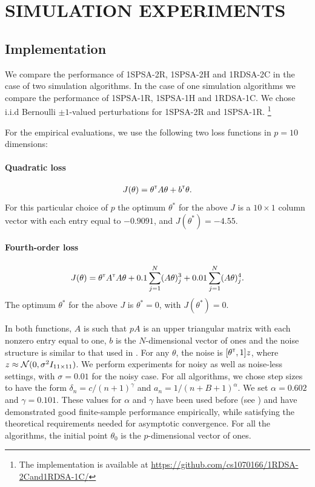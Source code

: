 \section{SIMULATION EXPERIMENTS}
\label{sec:expts}
\subsection{Implementation}
We compare the performance of 1SPSA-2R, 1SPSA-2H and 1RDSA-2C in the case of 
two simulation algorithms. In the case of one simulation algorithms we compare the 
performance of 1SPSA-1R, 1SPSA-1H and 1RDSA-1C. 
We chose i.i.d Bernoulli $\pm 1$-valued perturbations for 1SPSA-2R and 1SPSA-1R.
\footnote{The implementation is available at 
\url{https://github.com/cs1070166/1RDSA-2Cand1RDSA-1C/}}

For the empirical evaluations, 
we use the following two loss functions in $p=10$ dimensions:
\paragraph{Quadratic loss}
\begin{align}
J(\theta) = \theta^\mathsf{\scriptscriptstyle T} A \theta + b^\mathsf{\scriptscriptstyle T} \theta. \label{eq:quadratic}
\end{align} 
For this particular choice of $p$ the optimum $\theta^*$ for the above $J$ is 
a $10 \times 1$ column vector with each entry equal to 
$-0.9091$, and $J(\theta^*) = -4.55$.

\paragraph{Fourth-order loss}
\begin{align} 
J(\theta) = \theta ^\mathsf{\scriptscriptstyle T} A^\mathsf{\scriptscriptstyle T} A\theta+0.1 \sum_{j=1}^N (A\theta)^3_j+0.01 \sum_{j=1}^N (A\theta)^4_j.\label{eq:4thorder}
 \end{align} 
The optimum $\theta^*$ for the above $J$ is $\theta^*=0$, with $J(\theta^*) = 0$. 

In both functions, $A$ is such that $pA$ is an upper triangular matrix with each 
nonzero entry equal to one, $b$ is the $N$-dimensional vector of ones and 
the noise structure is similar to that used in \cite{spall_adaptive}. 
For any $\theta$, the noise is $[\theta^\mathsf{\scriptscriptstyle T}, 1]z$, where $z \approx \mathcal{N}(0,\sigma^2 I_{11\times11})$.
We perform experiments for noisy as well as noise-less settings, with $\sigma=0.01$ for
the noisy case. 
For all algorithms, we chose step sizes to have the form 
$\delta_n = c/(n+1)^{\gamma}$ and $a_n = 1/(n+B+1)^{\alpha}$.
We set $\alpha=0.602$ and $\gamma=0.101$.
These values for $\alpha$ and $\gamma$ have been used  before (see 
\cite{spall_adaptive}) and have demonstrated good finite-sample performance 
empirically, while satisfying the theoretical requirements needed for asymptotic 
convergence.  For all the algorithms, the initial point $\theta_0$ is the 
$p$-dimensional vector of ones.

